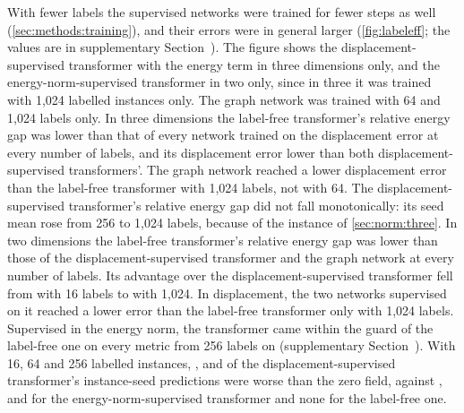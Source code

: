With fewer labels the supervised networks were trained for fewer steps as well
(\cref{sec:methods:training}), and their errors were in general larger (\cref{fig:labeleff};
the values are in supplementary Section~\SuppThree{}). The figure shows the
displacement-supervised transformer with the energy term in three dimensions only, and the
energy-norm-supervised transformer in two only, since in three it was trained with 1,024 labelled instances only. The graph network was
trained with 64 and 1,024 labels only. In three dimensions the label-free
transformer's relative energy gap was lower than that of every network trained on the
displacement error at every number of labels, and its displacement error lower than both displacement-supervised transformers'. The graph network reached a lower displacement error than the label-free transformer with
1,024 labels, not with 64. The displacement-supervised transformer's relative energy gap did
not fall monotonically: its seed mean rose from 256 to 1,024 labels, because of the instance of
\cref{sec:norm:three}. In two dimensions the label-free transformer's relative energy gap
was lower than those of the displacement-supervised transformer and the graph network at every number of labels. Its advantage over the displacement-supervised transformer fell from
\numCmAdvMax{} with 16 labels to \numCmAdvMin{} with 1,024. In displacement, the two
networks supervised on it reached a lower error than the label-free transformer only with 1,024 labels. Supervised in the energy norm, the transformer came within the guard of the label-free one on every
metric from 256 labels on (supplementary Section~\SuppTwo{}). With 16, 64 and 256 labelled
instances, \numCmLabWorseSixteen{}, \numCmLabWorseSixtyFour{} and \numCmLabWorseTwoFiveSix{}
of the displacement-supervised transformer's \numCmPairs{} instance-seed predictions were
worse than the zero field, against \numCmKnormWorseSixteen{}, \numCmKnormWorseSixtyFour{}
and \numCmKnormWorseTwoFiveSix{} for the energy-norm-supervised transformer and none for the
label-free one.
